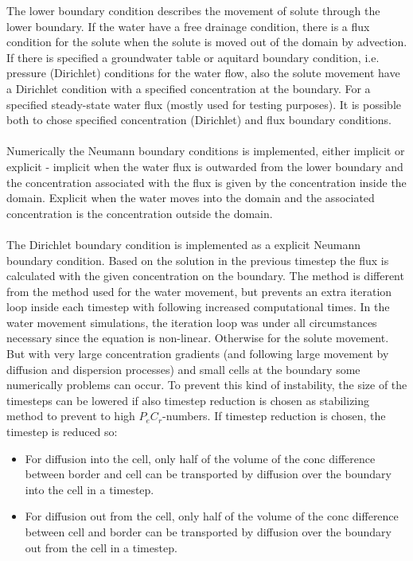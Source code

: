 \documentclass{report}
\begin{document}
The lower boundary condition describes the movement of solute
through the lower boundary. If the water have a free drainage
condition, there is a flux condition for the solute when the solute is
moved out of the domain by advection. If there is specified a
groundwater table or aquitard boundary condition, i.e. pressure
(Dirichlet) conditions for the water flow, also the solute movement
have a Dirichlet condition with a specified concentration at the
boundary. For a specified steady-state water flux (mostly used for
testing purposes). It is possible both to chose specified
concentration (Dirichlet) and flux boundary conditions. \\
\\
Numerically the Neumann boundary conditions is implemented,
either implicit or explicit - implicit when the water flux is outwarded
from the lower boundary and the concentration associated with the
flux is given by the concentration inside the domain. Explicit when
the water moves into the domain and the associated concentration
is the concentration outside the domain. \\
\\
The Dirichlet boundary condition is implemented as a explicit
Neumann boundary condition. Based on the solution in the previous
timestep the flux is calculated with the given concentration on the
boundary. The method is different from the method used for the
water movement, but prevents an extra iteration loop inside each
timestep with following increased computational times. In the water
movement simulations, the iteration loop was under all
circumstances necessary since the equation is non-linear. Otherwise
for the solute movement. But with very large concentration
gradients (and following large movement by diffusion and dispersion
processes) and small cells at the boundary some numerically
problems can occur. To prevent this kind of instability, the size of
the timesteps can be lowered if also timestep reduction is chosen as
stabilizing method to prevent to high $P_eC_r$-numbers. If
timestep reduction is chosen, the timestep is reduced so:

\begin{itemize}
\item  For diffusion into the cell, only half of the volume of the
    conc difference between border and cell can be transported by
    diffusion over the boundary into the cell in a timestep.
\item For diffusion out from the cell, only half of the volume of
    the conc difference between cell and border can be
    transported by diffusion over the boundary out from the cell in
    a timestep.
 \end{itemize}
\end{document}
